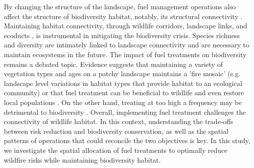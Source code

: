 By changing the structure of the landscape, fuel management operations also affect the structure of biodiversity habitat, notably, its structural connectivity \citep{Taylor93}. Maintaining habitat connectivity, through wildlife corridors, landscape links, and ecoducts \citep{Turner2005, Turner2011}, is instrumental in mitigating the biodiversity crisis. Species richness and diversity are intimately linked to landscape connectivity \citep{Olds2012, tian_assessing_2017, velazquez_structural_2019} and are necessary to maintain ecosystems in the future.  The impact of fuel treatments on biodiversity remains a debated topic. Evidence suggests that maintaining a variety of vegetation types and ages on a patchy landscape maintains a 'fire mosaic' \citep{Sitters2015} (e.g. landscape level variations in habitat types that provide habitat to an ecological community) or that fuel treatment can be beneficial to wildlife \citep{saab_short-term_2022, loeb_bats_2021} and even restore local populations \citep{Templeton2011}. On the other hand, treating at too high a frequency may be detrimental to biodiversity \citep{bradshaw2018}. Overall, implementing fuel treatment challenges the connectivity of wildlife habitat.
In this context, understanding the trade-offs between risk reduction and biodiversity conservation, as well as the spatial patterns of operations that could reconcile the two objectives is key. In this study, we investigate the spatial allocation of fuel treatments to optimally reduce wildfire risks while maintaining biodiversity habitat.


